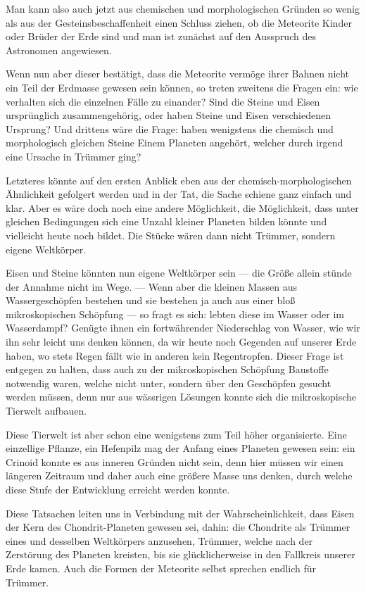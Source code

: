 \documentclass[a4paper, 12pt, oneside]{article}
\begin{document}
Man kann also auch jetzt aus chemischen und morphologischen Gründen so wenig als aus der Gesteinsbeschaffenheit einen Schluss ziehen, ob die Meteorite Kinder oder Brüder der Erde sind und man ist zunächst auf den Ausspruch des Astronomen angewiesen.

Wenn nun aber dieser bestätigt, dass die Meteorite vermöge ihrer Bahnen nicht ein Teil der Erdmasse gewesen sein können, so treten zweitens die Fragen ein: wie verhalten sich die einzelnen Fälle zu einander? Sind die Steine und Eisen ursprünglich zusammengehörig, oder haben Steine und Eisen verschiedenen Ursprung? Und drittens wäre die Frage: haben wenigstens die chemisch und morphologisch gleichen Steine Einem Planeten angehört, welcher durch irgend eine Ursache in Trümmer ging?

Letzteres könnte auf den ersten Anblick eben aus der chemisch-morphologischen Ähnlichkeit gefolgert werden und in der Tat, die Sache schiene ganz einfach und klar. Aber es wäre doch noch eine andere Möglichkeit, die Möglichkeit, dass unter gleichen Bedingungen sich eine Unzahl kleiner Planeten bilden könnte und vielleicht heute noch bildet. Die Stücke wären dann nicht Trümmer, sondern eigene Weltkörper.

Eisen und Steine könnten nun eigene Weltkörper sein — die Größe allein stünde der Annahme nicht im Wege. — Wenn aber die kleinen Massen aus Wassergeschöpfen bestehen und sie bestehen ja auch aus einer bloß mikroskopischen Schöpfung — so fragt es sich: lebten diese im Wasser oder im Wasserdampf? Genügte ihnen ein fortwährender Niederschlag von Wasser, wie wir ihn sehr leicht uns denken können, da wir heute noch Gegenden auf unserer Erde haben, wo stets Regen fällt wie in anderen kein Regentropfen. Dieser Frage ist entgegen zu halten, dass auch zu der mikroskopischen Schöpfung Baustoffe notwendig waren, welche nicht unter, sondern über den Geschöpfen gesucht werden müssen, denn nur aus wässrigen Lösungen konnte sich die mikroskopische Tierwelt aufbauen.

Diese Tierwelt ist aber schon eine wenigstens zum Teil höher organisierte. Eine einzellige Pflanze, ein Hefenpilz mag der Anfang eines Planeten gewesen sein: ein Crinoid konnte es aus inneren Gründen nicht sein, denn hier müssen wir einen längeren Zeitraum und daher auch eine größere Masse uns denken, durch welche diese Stufe der Entwicklung erreicht werden konnte.

Diese Tatsachen leiten uns in Verbindung mit der Wahrscheinlichkeit, dass Eisen der Kern des Chondrit-Planeten gewesen sei, dahin: die Chondrite als Trümmer eines und desselben Weltkörpers anzusehen, Trümmer, welche nach der Zerstörung des Planeten kreisten, bis sie glücklicherweise in den Fallkreis unserer Erde kamen. Auch die Formen der Meteorite selbst sprechen endlich für Trümmer.
\end{document}
